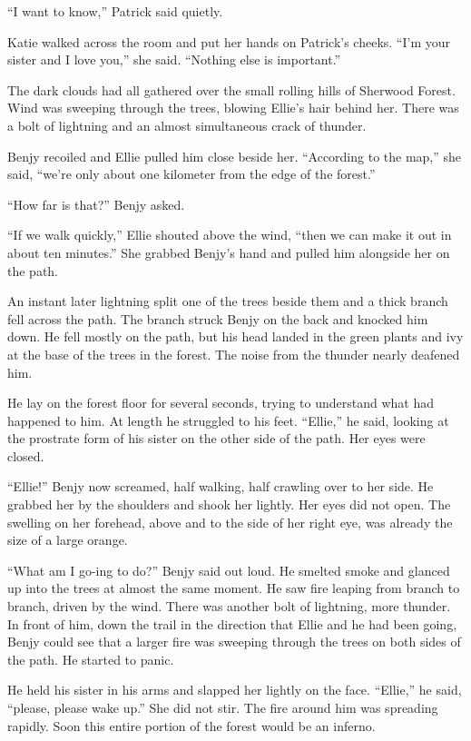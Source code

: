 \documentclass[]{article}
\begin{document}
{“I want to know,” Patrick said quietly.

Katie walked across the room and put her hands on Patrick’s cheeks. “I’m your sister and I love you,” she said. “Nothing else is important.”

The dark clouds had all gathered over the small rolling hills of Sherwood Forest. Wind was sweeping through the trees, blowing Ellie’s hair behind her. There was a bolt of lightning and an almost simultaneous crack of thunder.

Benjy recoiled and Ellie pulled him close beside her. “According to the map,” she said, “we’re only about one kilometer from the edge of the forest.”

“How far is that?” Benjy asked.

“If we walk quickly,” Ellie shouted above the wind, “then we can make it out in about ten minutes.” She grabbed Benjy’s hand and pulled him alongside her on the path.

An instant later lightning split one of the trees beside them and a thick branch fell across the path. The branch struck Benjy on the back and knocked him down. He fell mostly on the path, but his head landed in the green plants and ivy at the base of the trees in the forest. The noise from the thunder nearly deafened him.

He lay on the forest floor for several seconds, trying to understand what had happened to him. At length he struggled to his feet. “Ellie,” he said, looking at the prostrate form of his sister on the other side of the path. Her eyes were closed.

“Ellie!” Benjy now screamed, half walking, half crawling over to her side. He grabbed her by the shoulders and shook her lightly. Her eyes did not open. The swelling on her forehead, above and to the side of her right eye, was already the size of a large orange.

“What am I go-ing to do?” Benjy said out loud. He smelted smoke and glanced up into the trees at almost the same moment. He saw fire leaping from branch to branch, driven by the wind. There was another bolt of lightning, more thunder. In front of him, down the trail in the direction that Ellie and he had been going, Benjy could see that a larger fire was sweeping through the trees on both sides of the path. He started to panic.

He held his sister in his arms and slapped her lightly on the face. “Ellie,” he said, “please, please wake up.” She did not stir. The fire around him was spreading rapidly. Soon this entire portion of the forest would be an inferno.

}
\end{document}
